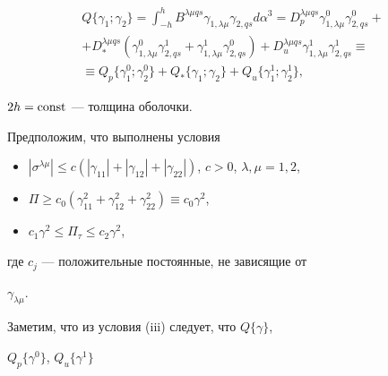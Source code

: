 \begin{multline} 


Q\{\gamma_1;\gamma_2\}=\int^h_{-h}B^{\lambda\mu q s} 


\gamma_{1,\lambda\mu}\gamma_{2,q s}d\alpha^3= 


D^{\lambda\mu q s}_p\gamma^0_{1,\lambda\mu} 


\gamma^0_{2,q s}+ \\ 


% 


+D^{\lambda\mu q s}_*(\gamma^0_{1,\lambda\mu} 


\gamma^1_{2,q s}+\gamma^1_{1,\lambda\mu}\gamma^0_{2,q s})+ 


D^{\lambda\mu q s}_u \gamma^1_{1,\lambda\mu} 


\gamma^1_{2, q s}\equiv \\ 


% 


\equiv Q_p\{\gamma^0_1;\gamma^0_2\}+Q_*\{\gamma_1;\gamma_2\}+ 


Q_u\{\gamma^1_1;\gamma^1_2\}, 


\end{multline} 


$2h=\operatorname{const}$ --- толщина оболочки. 


 


Предположим, что выполнены условия 


\begin{itemize} 


\item[(i)] $|\sigma^{\lambda\mu}|\le c(|\gamma_{11}|+ 


|\gamma_{12}|+|\gamma_{22}|)$, $c>0$, $\lambda,\mu=1,2$, 


\item[(ii)] $\Pi\ge c_0(\gamma^2_{11}+\gamma^2_{12}+ 


\gamma^2_{22})\equiv c_0\gamma^2$, 


\item[(iii)] $c_1\gamma^2\le\Pi_\tau\le c_2\gamma^2$, 


\end{itemize} 


где $c_j$ --- положительные постоянные, не зависящие от 


$\gamma_{\lambda\mu}$. 


Заметим, что из условия (iii) следует, что $Q\{\gamma\}$, 


$Q_p\{\gamma^0\}$, $Q_u\{\gamma^1\}$ 



